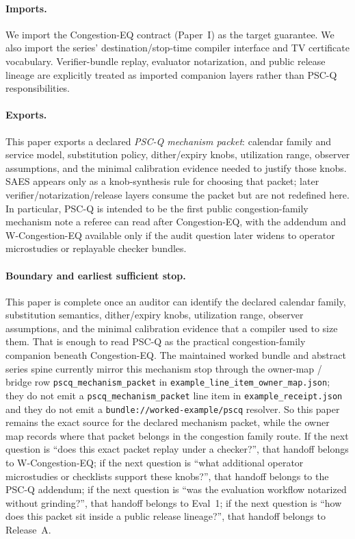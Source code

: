 \documentclass[11pt]{article}
\theoremstyle{definition}
\theoremstyle{remark}
\begin{document}
\paragraph{Imports.}
We import the Congestion-EQ contract (Paper~I) as the target guarantee.\cite{series:congeq}
We also import the series' destination/stop-time compiler interface and TV certificate vocabulary.\cite{series:schedcompiler,series:knapsacktransport}
Verifier-bundle replay, evaluator notarization, and public release lineage are explicitly treated as imported companion layers rather than PSC-Q responsibilities.\cite{series:wcongeq,series:evalnotary,anondht_release_receipts}

\paragraph{Exports.}
This paper exports a declared \emph{PSC-Q mechanism packet}: calendar family and service model, substitution policy, dither/expiry knobs, utilization range, observer assumptions, and the minimal calibration evidence needed to justify those knobs.
SAES appears only as a knob-synthesis rule for choosing that packet; later verifier/notarization/release layers consume the packet but are not redefined here. In particular, PSC-Q is intended to be the first public congestion-family mechanism note a referee can read after Congestion-EQ, with the addendum and W-Congestion-EQ available only if the audit question later widens to operator microstudies or replayable checker bundles.

\paragraph{Boundary and earliest sufficient stop.}
This paper is complete once an auditor can identify the declared calendar family, substitution semantics, dither/expiry knobs, utilization range, observer assumptions, and the minimal calibration evidence that a compiler used to size them.
That is enough to read PSC-Q as the practical congestion-family companion beneath Congestion-EQ. The maintained worked bundle and abstract series spine currently mirror this mechanism stop through the owner-map / bridge row \nolinkurl{pscq\_mechanism\_packet} in \nolinkurl{example\_line\_item\_owner\_map.json}; they do not emit a \nolinkurl{pscq\_mechanism\_packet} line item in \nolinkurl{example\_receipt.json} and they do not emit a \nolinkurl{bundle://worked-example/pscq} resolver. So this paper remains the exact source for the declared mechanism packet, while the owner map records where that packet belongs in the congestion family route. If the next question is ``does this exact packet replay under a checker?'', that handoff belongs to W-Congestion-EQ; if the next question is ``what additional operator microstudies or checklists support these knobs?'', that handoff belongs to the PSC-Q addendum; if the next question is ``was the evaluation workflow notarized without grinding?'', that handoff belongs to Eval~1; if the next question is ``how does this packet sit inside a public release lineage?'', that handoff belongs to Release~A.\cite{series:workedexample,series:seriesspines,series:pscqaddendum,series:wcongeq,series:evalnotary,anondht_release_receipts}
\end{document}
